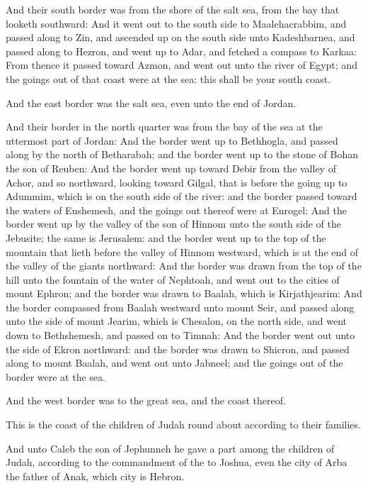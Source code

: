 \Verse And their south border was from the shore of the salt sea, from the bay that looketh southward: \Verse And it went out to the south side to Maalehacrabbim, and passed along to Zin, and ascended up on the south side unto Kadeshbarnea, and passed along to Hezron, and went up to Adar, and fetched a compass to Karkaa: \Verse From thence it passed toward Azmon, and went out unto the river of Egypt; and the goings out of that coast were at the sea: this shall be your south coast.

\Verse And the east border was the salt sea, even unto the end of Jordan.

And their border in the north quarter was from the bay of the sea at the uttermost part of Jordan: \Verse And the border went up to Bethhogla, and passed along by the north of Betharabah; and the border went up to the stone of Bohan the son of Reuben: \Verse And the border went up toward Debir from the valley of Achor, and so northward, looking toward Gilgal, that is before the going up to Adummim, which is on the south side of the river: and the border passed toward the waters of Enshemesh, and the goings out thereof were at Enrogel: \Verse And the border went up by the valley of the son of Hinnom unto the south side of the Jebusite; the same is Jerusalem: and the border went up to the top of the mountain that lieth before the valley of Hinnom westward, which is at the end of the valley of the giants northward: \Verse And the border was drawn from the top of the hill unto the fountain of the water of Nephtoah, and went out to the cities of mount Ephron; and the border was drawn to Baalah, which is Kirjathjearim: \Verse And the border compassed from Baalah westward unto mount Seir, and passed along unto the side of mount Jearim, which is Chesalon, on the north side, and went down to Bethshemesh, and passed on to Timnah: \Verse And the border went out unto the side of Ekron northward: and the border was drawn to Shicron, and passed along to mount Baalah, and went out unto Jabneel; and the goings out of the border were at the sea.

\Verse And the west border was to the great sea, and the coast thereof.

This is the coast of the children of Judah round about according to their families.

\Verse And unto Caleb the son of Jephunneh he gave a part among the children of Judah, according to the commandment of the \LORD to Joshua, even the city of Arba the father of Anak, which city is Hebron.

